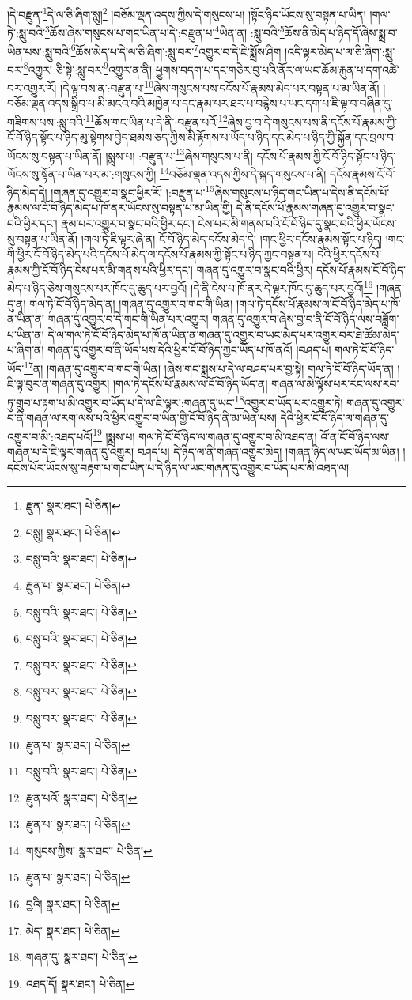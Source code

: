 །དེ་བརྫུན་\footnote{རྫུན་  སྣར་ཐང་།  པེ་ཅིན། }དེ་ལ་ཅི་ཞིག་སླུ།\footnote{བསླུ།  སྣར་ཐང་།  པེ་ཅིན། } །བཅོམ་ལྡན་འདས་ཀྱིས་དེ་གསུངས་པ། །སྟོང་ཉིད་ཡོངས་སུ་བསྟན་པ་ཡིན། །གལ་ཏེ་:སླུ་བའི་\footnote{བསླུ་བའི་  སྣར་ཐང་།  པེ་ཅིན། }ཆོས་ཞེས་གསུངས་པ་གང་ཡིན་པ་དེ་:བརྫུན་པ་\footnote{རྫུན་པ་  སྣར་ཐང་།  པེ་ཅིན། }ཡིན་ན། :སླུ་བའི་\footnote{བསླུ་བའི་  སྣར་ཐང་།  པེ་ཅིན། }ཆོས་ནི་མེད་པ་ཉིད་དོ་ཞེས་སྨྲ་བ་ཡིན་པས་:སླུ་བའི་\footnote{བསླུ་བའི་  སྣར་ཐང་།  པེ་ཅིན། }ཆོས་མེད་པ་དེ་ལ་ཅི་ཞིག་:སླུ་བར་\footnote{བསླུ་བར་  སྣར་ཐང་།  པེ་ཅིན། }འགྱུར་བ་དེ་ཇེ་སྨྲོས་ཤིག །འདི་ལྟར་མེད་པ་ལ་ཅི་ཞིག་:སླུ་བར་\footnote{བསླུ་བར་  སྣར་ཐང་།  པེ་ཅིན། }འགྱུར། ཅི་སྟེ་:སླུ་བར་\footnote{བསླུ་བར་  སྣར་ཐང་།  པེ་ཅིན། }འགྱུར་ན་ནི། ཕྱུགས་བདག་པ་དང་གཅེར་བུ་པའི་ནོར་ལ་ཡང་ཆོམ་རྐུན་པ་དག་འཚེ་བར་འགྱུར་རོ། །དེ་ལྟ་བས་ན་:བརྫུན་པ་\footnote{རྫུན་པ་  སྣར་ཐང་།  པེ་ཅིན། }ཞེས་གསུངས་པས་དངོས་པོ་རྣམས་མེད་པར་བསྟན་པ་མ་ཡིན་ནོ། །བཅོམ་ལྡན་འདས་སྒྲིབ་པ་མི་མངའ་བའི་མཁྱེན་པ་དང་རྣམ་པར་ཐར་པ་བརྙེས་པ་ཡང་དག་པ་ཇི་ལྟ་བ་བཞིན་དུ་གཟིགས་པས་:སླུ་བའི་\footnote{བསླུ་བའི་  སྣར་ཐང་།  པེ་ཅིན། }ཆོས་གང་ཡིན་པ་དེ་ནི་:བརྫུན་པའོ་\footnote{རྫུན་པའོ་  སྣར་ཐང་།  པེ་ཅིན། }ཞེས་བྱ་བ་དེ་གསུངས་པས་ནི་དངོས་པོ་རྣམས་ཀྱི་ངོ་བོ་ཉིད་སྟོང་པ་ཉིད་མུ་སྟེགས་བྱེད་ཐམས་ཅད་ཀྱིས་མི་རྟོགས་པ་ཡོད་པ་ཉིད་དང་མེད་པ་ཉིད་ཀྱི་སྐྱོན་དང་བྲལ་བ་ཡོངས་སུ་བསྟན་པ་ཡིན་ནོ། །སྨྲས་པ། :བརྫུན་པ་\footnote{རྫུན་པ་  སྣར་ཐང་།  པེ་ཅིན། }ཞེས་གསུངས་པ་ནི། དངོས་པོ་རྣམས་ཀྱི་ངོ་བོ་ཉིད་སྟོང་པ་ཉིད་ཡོངས་སུ་སྟོན་པ་ཡིན་པར་མ་:གསུངས་ཀྱི། \footnote{གསུངས་ཀྱིས་  སྣར་ཐང་།  པེ་ཅིན། }བཅོམ་ལྡན་འདས་ཀྱིས་དེ་སྐད་གསུངས་པ་ནི། དངོས་རྣམས་ངོ་བོ་ཉིད་མེད་དེ། །གཞན་དུ་འགྱུར་བ་སྣང་ཕྱིར་རོ། །:བརྫུན་པ་\footnote{རྫུན་པ་  སྣར་ཐང་།  པེ་ཅིན། }ཞེས་གསུངས་པ་ཉིད་གང་ཡིན་པ་དེས་ནི་དངོས་པོ་རྣམས་ལ་ངོ་བོ་ཉིད་མེད་པ་ཁོ་ནར་ཡོངས་སུ་བསྟན་པ་མ་ཡིན་གྱི། དེ་ནི་དངོས་པོ་རྣམས་གཞན་དུ་འགྱུར་བ་སྣང་བའི་ཕྱིར་དང་། རྣམ་པར་འགྱུར་བ་སྣང་བའི་ཕྱིར་དང་། ངེས་པར་མི་གནས་པའི་ངོ་བོ་ཉིད་དུ་སྣང་བའི་ཕྱིར་ཡོངས་སུ་བསྟན་པ་ཡིན་ནོ། །གལ་ཏེ་ཇི་ལྟར་ཞེ་ན། ངོ་བོ་ཉིད་མེད་དངོས་མེད་དེ། །གང་ཕྱིར་དངོས་རྣམས་སྟོང་པ་ཉིད། །གང་གི་ཕྱིར་ངོ་བོ་ཉིད་མེད་པའི་དངོས་པོ་མེད་ལ་དངོས་པོ་རྣམས་ཀྱི་སྟོང་པ་ཉིད་ཀྱང་བསྟན་པ། དེའི་ཕྱིར་དངོས་པོ་རྣམས་ཀྱི་ངོ་བོ་ཉིད་ངེས་པར་མི་གནས་པའི་ཕྱིར་དང་། གཞན་དུ་འགྱུར་བ་སྣང་བའི་ཕྱིར། དངོས་པོ་རྣམས་ངོ་བོ་ཉིད་མེད་པ་ཉིད་ཅེས་གསུངས་པར་ཁོང་དུ་ཆུད་པར་བྱའོ། །དེ་ནི་ངེས་པ་ཁོ་ནར་དེ་ལྟར་ཁོང་དུ་ཆུད་པར་བྱའོ།\footnote{བྱའི།  སྣར་ཐང་།  པེ་ཅིན། } །གཞན་དུ་ན། གལ་ཏེ་ངོ་བོ་ཉིད་མེད་ན། །གཞན་དུ་འགྱུར་བ་གང་གི་ཡིན། །གལ་ཏེ་དངོས་པོ་རྣམས་ལ་ངོ་བོ་ཉིད་མེད་པ་ཁོ་ན་ཡིན་ན། གཞན་དུ་འགྱུར་བ་དེ་གང་གི་ཡིན་པར་འགྱུར། གཞན་དུ་འགྱུར་བ་ཞེས་བྱ་བ་ནི་ངོ་བོ་ཉིད་ལས་བཟློག་པ་ཡིན་ན། དེ་ལ་གལ་ཏེ་ངོ་བོ་ཉིད་མེད་པ་ཁོ་ན་ཡིན་ན་གཞན་དུ་འགྱུར་བ་ཡང་མེད་པར་འགྱུར་བར་ཐེ་ཚོམ་མེད་པ་ཞིག་ན། གཞན་དུ་འགྱུར་བ་ནི་ཡོད་པས་དེའི་ཕྱིར་ངོ་བོ་ཉིད་ཀྱང་ཡོད་པ་ཁོ་ནའོ། །བཤད་པ། གལ་ཏེ་ངོ་བོ་ཉིད་ཡོད་\footnote{མེད་  སྣར་ཐང་།  པེ་ཅིན། }ན། །གཞན་དུ་འགྱུར་བ་གང་གི་ཡིན། །ཞེས་གང་སྨྲས་པ་དེ་ལ་བཤད་པར་བྱ་སྟེ། གལ་ཏེ་ངོ་བོ་ཉིད་ཡོད་ན། །ཇི་ལྟ་བུར་ན་གཞན་དུ་འགྱུར། །གལ་ཏེ་དངོས་པོ་རྣམས་ལ་ངོ་བོ་ཉིད་ཡོད་ན། གཞན་ལ་མི་ལྟོས་པར་རང་ལས་རབ་ཏུ་གྲུབ་པ་རྟག་པ་མི་འགྱུར་བ་ཡོད་པ་དེ་ལ་ཇི་ལྟར་:གཞན་དུ་ཡང་\footnote{གཞན་དུ་  སྣར་ཐང་།  པེ་ཅིན། }འགྱུར་བ་ཡོད་པར་འགྱུར་ཏེ། གཞན་དུ་འགྱུར་བ་ནི་གཞན་ལ་རག་ལས་པའི་ཕྱིར་འགྱུར་བ་ཡིན་གྱི་ངོ་བོ་ཉིད་ནི་མ་ཡིན་པས། དེའི་ཕྱིར་ངོ་བོ་ཉིད་ལ་གཞན་དུ་འགྱུར་བ་མི་:འཐད་པའོ།\footnote{འཐད་དོ།  སྣར་ཐང་།  པེ་ཅིན། } །སྨྲས་པ། གལ་ཏེ་ངོ་བོ་ཉིད་ལ་གཞན་དུ་འགྱུར་བ་མི་འཐད་ན། འོ་ན་ངོ་བོ་ཉིད་ལས་གཞན་པ་དེ་ཇི་ལྟར་གཞན་དུ་འགྱུར། བཤད་པ། དེ་ཉིད་ལ་ནི་གཞན་འགྱུར་མེད། །གཞན་ཉིད་ལ་ཡང་ཡོད་མ་ཡིན། །དངོས་པོར་ཡོངས་སུ་བརྟག་པ་གང་ཡིན་པ་དེ་ཉིད་ལ་ཡང་གཞན་དུ་འགྱུར་བ་ཡོད་པར་མི་འཐད་ལ། 